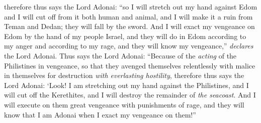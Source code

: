 \begin{biblechapter}
\verse therefore thus says the Lord Adonai: “so I will stretch out my hand against Edom and I will cut off from it both human and animal, and I will make it a ruin from Teman and Dedan; they will fall by the sword.
\verse And I will exact my vengeance on Edom by the hand of my people Israel, and they will do in Edom according to my anger and according to my rage, and they will know my vengeance,” \textit{declares} the Lord Adonai.
\verse Thus says the Lord Adonai: “Because of the \textit{acting} of the Philistines in vengeance, so that they avenged themselves relentlessly with malice in themselves for destruction \textit{with everlasting hostility},
\verse therefore thus says the Lord Adonai: ‘Look! I am stretching out my hand against the Philistines, and I will cut off the Kerethites, and I will destroy the remainder of \textit{the seacoast}.
\verse And I will execute on them great vengeance with punishments of rage, and they will know that I am Adonai when I exact my vengeance on them!”
\end{biblechapter}

